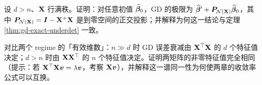 \begin{exercise}\label{ex:gd-limit-anyinit}
设 $d > n$、$\mathbf{X}$ 行满秩。证明：对任意初值 $\widehat{\bm{\beta}}_0$，GD 的极限为 $\widehat{\bm{\beta}}' + \bm{P}_{\mathcal{N}(\mathbf{X})} \widehat{\bm{\beta}}_0$，其中 $\bm{P}_{\mathcal{N}(\mathbf{X})} = \bm{I} - \mathbf{X}^+\mathbf{X}$ 是到零空间的正交投影；并解释为何这一结论与定理 \ref{thm:gd-exact-underdet} 一致。
\end{exercise}

\begin{exercise}\label{ex:spectrum}
对比两个 regime 的「有效维数」：$n \gg d$ 时 GD 误差衰减由 $\mathbf{X}^\top\mathbf{X}$ 的 $d$ 个特征值决定；$d > n$ 时由 $\mathbf{X}\mathbf{X}^\top$ 的 $n$ 个特征值决定。证明两矩阵的非零特征值完全相同（提示：若 $\mathbf{X}^\top\mathbf{X} \bm{v} = \lambda \bm{v}$，考察 $\mathbf{X} \bm{v}$），并解释这一谱同一性为何使两章的收敛率公式可以互换。
\end{exercise}
